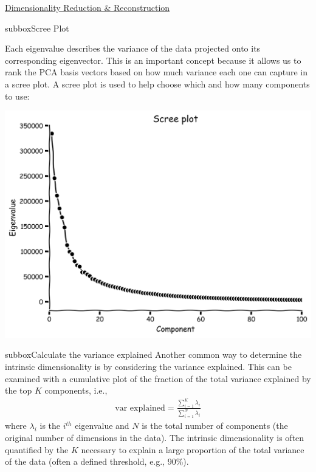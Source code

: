 \begin{textbox}{\href{https://compneuro.neuromatch.io/tutorials/W1D4_DimensionalityReduction/student/W1D4_Tutorial3.html}{Dimensionality Reduction \& Reconstruction } }
\begin{subbox}{subbox}{Scree Plot}
\scriptsize

Each eigenvalue describes the variance of the data projected onto its corresponding eigenvector. This is an important concept because it allows us to rank the PCA basis vectors based on how much variance each one can capture in a scree plot.
A scree plot is used to help choose which and how many components to use:

\centering
\includegraphics[scale=0.13]{Figures/DM/DMFigure3.png}

\end{subbox}

\begin{subbox}{subbox}{Calculate the variance explained
}
\scriptsize
Another common way to determine the intrinsic dimensionality is by considering the variance explained. This can be examined with a cumulative plot of the fraction of the total variance explained by the top $K$ components, i.e.,
\begin{align}
\text{var explained} = \frac{\sum_{i=1}^K \lambda_i}{\sum_{i=1}^N \lambda_i}
\end{align}
where $\lambda_i$ is the $i^{th}$ eigenvalue and $N$ is the total number of components (the original number of dimensions in the data).
The intrinsic dimensionality is often quantified by the $K$ necessary to explain a large proportion of the total variance of the data (often a defined threshold, e.g., 90\%).


\end{subbox}
\end{textbox}
